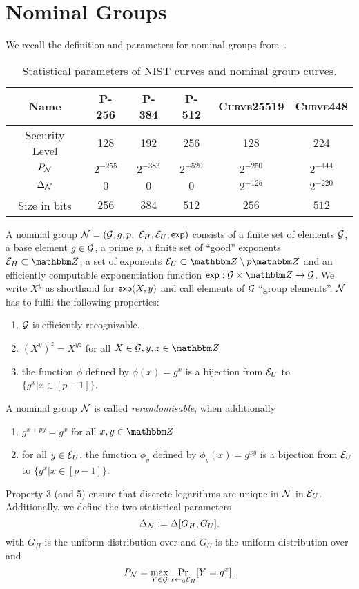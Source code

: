 \section{Nominal Groups}\label{app:nominal_groups}
We recall the definition and parameters for nominal groups from~\cite{EC:ABHKLR21_2}.
\begin{table*}[!tb]
	\center
	\begin{tabulary}{.5\textwidth}{cccccc}
		Name & \textbf{P-256  } & \textbf{P-384  } & \textbf{P-512  } & \textbf{\textsc{Curve}25519  } & \textbf{\textsc{Curve}448} \\
		\hline
		Security Level & 128 & 192 & 256 & 128 & 224 \\
		$P_\mathcal{N}$ & $2^{-255}$& $2^{-383}$& $2^{-520}$& $2^{-250}$& $2^{-444}$\\
		$\Delta_\mathcal{N}$ & 0 & 0 & 0 & $2^{-125}$ & $2^{-220}$ \\
		Size in bits & $256$ & $384$ & $512$ & $256$ & $512$ \\
		\hline
	\end{tabulary}
	\medskip
	\caption{Statistical parameters of NIST curves and nominal group curves.}
	\label{tab:nom_groups_params}
\end{table*}

\begin{definition}
  A nominal group $\mathcal{N} = (\mathcal{G}, g, p, $ $\mathcal{E}_H, \mathcal{E}_U, \textnormal{\sf exp})$ consists of a finite set of elements $\mathcal{G}$, a base element $g
  \in \mathcal{G}$, a prime $p$, a finite set of ``good'' exponents $\nGE \subset \Z$, a set of exponents $\nGU\subset
  \Z\setminus p\Z$ and an efficiently computable exponentiation function $\nGexp: \nG \times \Z \rightarrow \nG$. We
  write $X^y$ as shorthand for $\textnormal{\sf exp}(X,y)$ and call elements of $\mathcal{G}$ ``group elements''.
  $\mathcal{N}$ has to fulfil the following properties:
  \begin{enumerate}
  \item $\mathcal{G}$ is efficiently recognizable.
  \item $\left(X^y\right)^z = X^{yz}$ for all $X \in \nG, y,z\in\Z$
  \item the function $\phi$ defined by $\phi(x) = g^x$ is a bijection from $\mathcal{E}_U$ to $\{g^x | x\in[p-1]\}$.
  \end{enumerate}
  A nominal group $\mathcal{N}$ is called \emph{rerandomisable}, when additionally
  \begin{enumerate}[resume]
  \item $g^{x+py} = g^x$ for all $x,y\in\Z$
  \item for all $y\in\mathcal{E}_U$, the function $\phi_y$ defined by $\phi_y(x) = g^{xy}$ is a bijection from $\mathcal{E}_U$ to $\{g^x |
    x \in [p-1]\}$.
  \end{enumerate}

  Property 3 (and 5) ensure that discrete logarithms are unique in $\mathcal{N}$ in $\mathcal{E}_U$. 
  Additionally, we define the two statistical parameters
  \[
    \Delta_{\mathcal{N}} := \Delta[G_H, G_U],
  \]
  with $G_H$ is the uniform distribution over \nGE and $G_U$ is the uniform distribution over \nGU and
  \[
    P_\mathcal{N} = \max_{Y \in \mathcal{G}} \underset{x\gets_{\scriptscriptstyle\$} \mathcal{E}_H}{\text{Pr}}[Y = g^x].
  \]
\end{definition}

